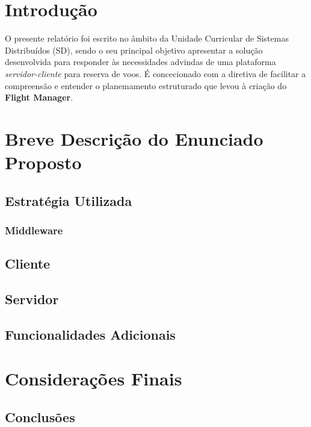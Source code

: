 \documentclass[a4paper,11pt]{scrreprt}
\begin{document}
\chapter{Introdução}

O presente relatório foi escrito no âmbito da Unidade Curricular de Sistemas Distribuídos (SD), sendo o
seu principal objetivo apresentar a solução desenvolvida para responder às necessidades advindas de uma 
plataforma \textit{servidor-cliente} para reserva de voos.
É concecionado com a diretiva de facilitar a compreensão e entender o planemamento estruturado que levou
à criação do \textbf{Flight Manager}.


\chapter{Breve Descrição do Enunciado Proposto}

\section{Estratégia Utilizada}

\subsection{Middleware}


\section{Cliente}


\section{Servidor}


\section{Funcionalidades Adicionais}

\chapter{Considerações Finais}
\section{Conclusões}
\end{document}
